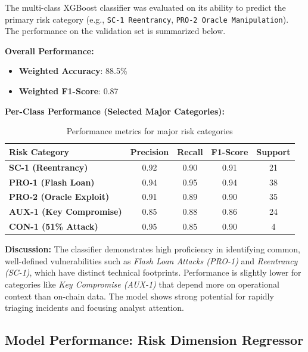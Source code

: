\documentclass[a4paper]{article}
\begin{document}
\begin{multicols}{2}
The multi-class XGBoost classifier was evaluated on its ability to predict the primary risk category (e.g., \texttt{SC-1 Reentrancy}, \texttt{PRO-2 Oracle Manipulation}). The performance on the validation set is summarized below.

\textbf{Overall Performance:}
\begin{itemize}
    \item \textbf{Weighted Accuracy}: 88.5\%
    \item \textbf{Weighted F1-Score}: 0.87
\end{itemize}

\textbf{Per-Class Performance (Selected Major Categories):}

\begin{table}[H]
\centering
\begin{tabular}{lcccc}
\toprule
\textbf{Risk Category} & \textbf{Precision} & \textbf{Recall} & \textbf{F1-Score} & \textbf{Support} \\
\midrule
\textbf{SC-1 (Reentrancy)} & 0.92 & 0.90 & 0.91 & 21 \\
\textbf{PRO-1 (Flash Loan)} & 0.94 & 0.95 & 0.94 & 38 \\
\textbf{PRO-2 (Oracle Exploit)} & 0.91 & 0.89 & 0.90 & 35 \\
\textbf{AUX-1 (Key Compromise)} & 0.85 & 0.88 & 0.86 & 24 \\
\textbf{CON-1 (51\% Attack)} & 0.95 & 0.85 & 0.90 & 4 \\
\bottomrule
\end{tabular}
\caption{Performance metrics for major risk categories}
\label{tab:classifier_performance}
\end{table}

\vspace{0.5cm}

\textbf{Discussion:} The classifier demonstrates high proficiency in identifying common, well-defined vulnerabilities such as \textit{Flash Loan Attacks (PRO-1)} and \textit{Reentrancy (SC-1)}, which have distinct technical footprints. Performance is slightly lower for categories like \textit{Key Compromise (AUX-1)} that depend more on operational context than on-chain data. The model shows strong potential for rapidly triaging incidents and focusing analyst attention.

\vspace{0.5cm}

\subsection{Model Performance: Risk Dimension Regressor}


\end{multicols}
\end{document}
